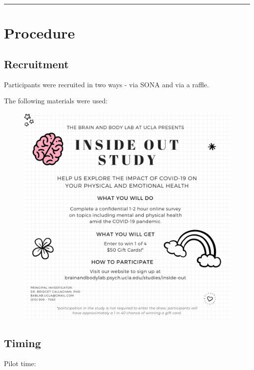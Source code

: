 \documentclass[]{book}
\begin{document}
\begin{center}\rule{0.5\linewidth}{0.5pt}\end{center}

\hypertarget{procedure}{%
\section{Procedure}\label{procedure}}

\hypertarget{recruitment}{%
\subsection{Recruitment}\label{recruitment}}

Participants were recruited in two ways - via SONA and via a raffle.

The following materials were used:

\begin{figure}
\centering
\includegraphics{images/inside_out_instagram.png}
\caption{}
\end{figure}

\hypertarget{timing}{%
\subsection{Timing}\label{timing}}

Pilot time:
\end{document}
